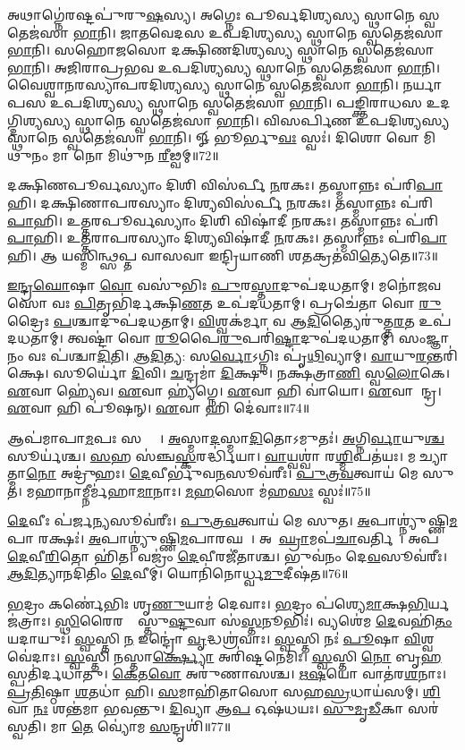 𑌅𑌥𑌾𑌗𑍍𑌨𑍇॑𑌰𑌷𑍍𑌟𑌪𑍁॑𑌰𑍁\ul{𑌷}𑌸𑍍𑌯। 
𑌅𑌗𑍍𑌨𑍇𑌃 𑌪𑍂𑌰𑍍𑌵𑌦𑌿𑌶𑍍𑌯𑌸𑍍𑌯 𑌸𑍍𑌥𑌾𑌨𑍇 𑌸𑍍𑌵𑌤𑍇𑌜॑𑌸𑌾 \ul{𑌭𑌾}𑌨𑌿। 
𑌜𑌾𑌤𑌵𑍇𑌦𑌸 𑌉𑌪𑌦𑌿𑌶𑍍𑌯𑌸𑍍𑌯 𑌸𑍍𑌥𑌾𑌨𑍇 𑌸𑍍𑌵𑌤𑍇𑌜॑𑌸𑌾 \ul{𑌭𑌾}𑌨𑌿। 
𑌸𑌹𑍋𑌜𑌸𑍋 𑌦𑌕𑍍𑌷𑌿𑌣𑌦𑌿𑌶𑍍𑌯𑌸𑍍𑌯 𑌸𑍍𑌥𑌾𑌨𑍇 𑌸𑍍𑌵𑌤𑍇𑌜॑𑌸𑌾 \ul{𑌭𑌾}𑌨𑌿। 
𑌅𑌜𑌿𑌰𑌾𑌪𑍍𑌰𑌭𑌵 𑌉𑌪𑌦𑌿𑌶𑍍𑌯𑌸𑍍𑌯 𑌸𑍍𑌥𑌾𑌨𑍇 𑌸𑍍𑌵𑌤𑍇𑌜॑𑌸𑌾 \ul{𑌭𑌾}𑌨𑌿। 
𑌵𑍈𑌶𑍍𑌵𑌾𑌨𑌰𑌸𑍍𑌯𑌾𑌪𑌰𑌦𑌿𑌶𑍍𑌯𑌸𑍍𑌯 𑌸𑍍𑌥𑌾𑌨𑍇 𑌸𑍍𑌵𑌤𑍇𑌜॑𑌸𑌾 \ul{𑌭𑌾}𑌨𑌿। 
𑌨𑌰𑍍𑌯𑌾𑌪𑌸 𑌉𑌪𑌦𑌿𑌶𑍍𑌯𑌸𑍍𑌯 𑌸𑍍𑌥𑌾𑌨𑍇 𑌸𑍍𑌵𑌤𑍇𑌜॑𑌸𑌾 \ul{𑌭𑌾}𑌨𑌿। 
𑌪𑌙𑍍𑌕𑍍𑌤𑌿𑌰𑌾𑌧𑌸 𑌉𑌦𑌗𑍍𑌦𑌿𑌶𑍍𑌯𑌸𑍍𑌯 𑌸𑍍𑌥𑌾𑌨𑍇 𑌸𑍍𑌵𑌤𑍇𑌜॑𑌸𑌾 \ul{𑌭𑌾}𑌨𑌿। 
𑌵𑌿𑌸𑌰𑍍𑌪𑌿𑌣 𑌉𑌪𑌦𑌿𑌶𑍍𑌯𑌸𑍍𑌯 𑌸𑍍𑌥𑌾𑌨𑍇 𑌸𑍍𑌵𑌤𑍇𑌜॑𑌸𑌾 \ul{𑌭𑌾}𑌨𑌿। 
𑍐 𑌭𑍂𑌰𑍍𑌭𑍁\ul{𑌵𑌃} 𑌸𑍍𑌵𑌃॑। 𑌦𑌿𑌶𑍋 𑌵𑍋 𑌮𑌿𑌥𑍁𑌨𑌂 𑌮𑌾 𑌨𑍋 𑌮𑌿𑌥𑍁॑𑌨 \ul{𑌰𑍀}𑌢𑍍𑌵𑌮𑍍॥72॥\anuvakamend


𑌦𑌕𑍍𑌷𑌿𑌣𑌪𑍂𑌰𑍍𑌵𑌸𑍍𑌯𑌾𑌂 𑌦𑌿𑌶𑌿 𑌵𑌿𑌸॑𑌰𑍍𑌪𑍀 \ul{𑌨}𑌰𑌕𑌃। 𑌤𑌸𑍍𑌮𑌾𑌨𑍍𑌨𑌃 𑌪॑𑌰𑌿\ul{𑌪𑌾}𑌹𑌿। 
𑌦𑌕𑍍𑌷𑌿𑌣𑌾𑌪𑌰𑌸𑍍𑌯𑌾𑌂 𑌦𑌿𑌶𑍍𑌯𑌵𑌿𑌸॑𑌰𑍍𑌪𑍀 \ul{𑌨}𑌰𑌕𑌃। 𑌤𑌸𑍍𑌮𑌾𑌨𑍍𑌨𑌃 𑌪॑𑌰𑌿\ul{𑌪𑌾}𑌹𑌿। 
𑌉𑌤𑍍𑌤𑌰𑌪𑍂𑌰𑍍𑌵𑌸𑍍𑌯𑌾𑌂 𑌦𑌿𑌶𑌿 𑌵𑌿𑌷𑌾॑𑌦𑍀 \ul{𑌨}𑌰𑌕𑌃। 𑌤𑌸𑍍𑌮𑌾𑌨𑍍𑌨𑌃 𑌪॑𑌰𑌿\ul{𑌪𑌾}𑌹𑌿। 
𑌉𑌤𑍍𑌤𑌰𑌾𑌪𑌰𑌸𑍍𑌯𑌾𑌂 𑌦𑌿𑌶𑍍𑌯𑌵𑌿𑌷𑌾॑𑌦𑍀 \ul{𑌨}𑌰𑌕𑌃। 𑌤𑌸𑍍𑌮𑌾𑌨𑍍𑌨𑌃 𑌪॑𑌰𑌿\ul{𑌪𑌾}𑌹𑌿। 
𑌆 𑌯𑌸𑍍𑌮𑌿𑌨𑍍𑌥𑍍𑌸𑌪𑍍𑌤 𑌵𑌾𑌸𑌵𑌾 𑌇𑌨𑍍𑌦𑍍𑌰𑌿𑌯𑌾𑌣𑌿 𑌶𑌤𑌕𑍍𑌰𑌤॑𑌵𑌿\ul{𑌤𑍍𑌯𑍇}𑌤𑍇॥73॥\anuvakamend


\ul{𑌇}\ul{𑌨𑍍𑌦𑍍𑌰}\ul{𑌘𑍋}𑌷𑌾 \ul{𑌵𑍋} 𑌵𑌸𑍁॑𑌭𑌿𑌃 \ul{𑌪𑍁}𑌰\ul{𑌸𑍍𑌤𑌾}𑌦𑍁𑌪॑𑌦𑌧𑌤𑌾𑌮𑍍‌। 
𑌮𑌨𑍋॑𑌜𑌵𑌸𑍋 𑌵𑌃 \ul{𑌪𑌿}𑌤𑍃𑌭𑌿॑𑌰𑍍𑌦𑌕𑍍𑌷𑌿\ul{𑌣}𑌤 𑌉𑌪॑𑌦𑌧𑌤𑌾𑌮𑍍‌। 
𑌪𑍍𑌰𑌚𑍇॑𑌤𑌾 𑌵𑍋 \ul{𑌰𑍁}𑌦𑍍𑌰𑍈𑌃 \ul{𑌪}𑌶𑍍𑌚𑌾𑌦𑍁𑌪॑𑌦𑌧𑌤𑌾𑌮𑍍‌। 
\ul{𑌵𑌿}𑌶𑍍𑌵𑌕॑𑌰𑍍𑌮𑌾 𑌵 𑌆\ul{𑌦𑌿}𑌤𑍍𑌯𑍈𑌰𑍁॑𑌤𑍍𑌤\ul{𑌰}𑌤 𑌉𑌪॑𑌦𑌧𑌤𑌾𑌮𑍍‌। 
𑌤𑍍𑌵𑌷𑍍𑌟𑌾॑ 𑌵𑍋 \ul{𑌰𑍂}𑌪𑍈\ul{𑌰𑍁}𑌪𑌰𑌿॑\ul{𑌷𑍍𑌟𑌾}𑌦𑍁𑌪॑\-𑌦𑌧𑌤𑌾𑌮𑍍‌। 
𑌸𑌂𑌜𑍍𑌞𑌾𑌨𑌂 𑌵𑌃 𑌪॑𑌶𑍍𑌚𑌾\ul{𑌦𑌿}𑌤𑌿। \ul{𑌆}\ul{𑌦𑌿}𑌤𑍍𑌯: 𑌸\ul{𑌰𑍍𑌵𑍋}𑌽𑌗𑍍𑌨𑌿𑌃 𑌪𑍃॑\ul{𑌥𑌿}𑌵𑍍𑌯𑌾𑌮𑍍‌। 
\ul{𑌵𑌾}𑌯𑍁\ul{𑌰}𑌨𑍍𑌤𑌰𑌿॑𑌕𑍍𑌷𑍇। 𑌸𑍂𑌰𑍍𑌯𑍋॑ \ul{𑌦𑌿}𑌵𑌿। \ul{𑌚}𑌨𑍍𑌦𑍍𑌰𑌮𑌾॑ \ul{𑌦𑌿}𑌕𑍍𑌷𑍁। 
𑌨𑌕𑍍𑌷॑𑌤𑍍𑌰𑌾\ul{𑌣𑌿} 𑌸𑍍𑌵\ul{𑌲𑍋}𑌕𑍇। \ul{𑌏}𑌵𑌾 𑌹𑍍𑌯𑍇॑𑌵। \ul{𑌏}𑌵𑌾 𑌹𑍍𑌯॑𑌗𑍍𑌨𑍇। 
\ul{𑌏}𑌵𑌾 𑌹𑌿 𑌵𑌾॑𑌯𑍋। \ul{𑌏}𑌵𑌾 𑌹𑍀᳚𑌨𑍍𑌦𑍍𑌰। \ul{𑌏}𑌵𑌾 𑌹𑌿 𑌪𑍂॑𑌷𑌨𑍍‌। \ul{𑌏}𑌵𑌾 𑌹𑌿 𑌦𑍇॑𑌵𑌾𑌃॥74॥\anuvakamend


𑌆𑌪॑𑌮𑌾𑌪𑌾\ul{𑌮}𑌪𑌃 𑌸𑌰𑍍𑌵𑌾𑌃᳚। \ul{𑌅}𑌸𑍍𑌮𑌾\ul{𑌦}𑌸𑍍𑌮𑌾\ul{𑌦𑌿}𑌤𑍋𑌽𑌮𑍁𑌤𑌃॑।
\ul{𑌅}𑌗𑍍𑌨𑌿\ul{𑌰𑍍𑌵𑌾}𑌯𑍁\ul{𑌶𑍍𑌚} 𑌸𑍂𑌰𑍍𑌯॑𑌶𑍍𑌚। \ul{𑌸}𑌹 𑌸॑𑌞𑍍𑌚\ul{𑌸𑍍𑌕}𑌰𑌰𑍍𑌦𑍍𑌧𑌿॑𑌯𑌾। 
\ul{𑌵𑌾}𑌯𑍍𑌵𑌶𑍍𑌵𑌾॑ 𑌰\ul{𑌶𑍍𑌮𑌿}𑌪𑌤॑𑌯𑌃। 𑌮𑌰𑍀᳚𑌚𑍍𑌯𑌾𑌤𑍍𑌮𑌾\ul{𑌨𑍋} 𑌅𑌦𑍍𑌰𑍁॑𑌹𑌃। 
\ul{𑌦𑍇}𑌵𑍀𑌰𑍍𑌭𑍁॑𑌵\ul{𑌨}𑌸𑍂𑌵॑𑌰𑍀𑌃। \ul{𑌪𑍁}\ul{𑌤𑍍𑌰}\ul{𑌵}𑌤𑍍𑌵𑌾𑌯॑ 𑌮𑍇 𑌸𑍁𑌤। 
𑌮𑌹𑌾𑌨𑌾𑌮𑍍𑌨𑍀𑌰𑍍𑌮॑𑌹𑌾\ul{𑌮𑌾}𑌨𑌾𑌃। \ul{𑌮}\ul{𑌹}𑌸𑍋 𑌮॑𑌹\ul{𑌸𑌃} 𑌸𑍍𑌵𑌃॑॥75॥


\ul{𑌦𑍇}𑌵𑍀𑌃 𑌪॑𑌰𑍍𑌜\ul{𑌨𑍍𑌯}𑌸𑍂𑌵॑𑌰𑍀𑌃। \ul{𑌪𑍁}\ul{𑌤𑍍𑌰}\ul{𑌵}𑌤𑍍𑌵𑌾𑌯॑ 𑌮𑍇 𑌸𑍁𑌤। 
\ul{𑌅}𑌪𑌾𑌶𑍍𑌨𑍍𑌯𑍁॑𑌷𑍍𑌣𑌿\ul{𑌮}𑌪𑌾 𑌰𑌕𑍍𑌷𑌃॑। \ul{𑌅}𑌪𑌾𑌶𑍍𑌨𑍍𑌯𑍁॑𑌷𑍍𑌣𑌿\-\ul{𑌮}𑌪𑌾𑌰𑌘𑌮𑍍᳚। 
𑌅𑌪𑌾᳚\ul{𑌘𑍍𑌰𑌾}𑌮𑌪॑\ul{𑌚𑌾}𑌵𑌰𑍍𑌤𑌿𑌮𑍍᳚। 𑌅𑌪॑\ul{𑌦𑍇}𑌵𑍀\ul{𑌰𑌿}𑌤𑍋 𑌹𑌿॑𑌤। 
𑌵𑌜𑍍𑌰𑌂॑ \ul{𑌦𑍇}𑌵𑍀𑌰𑌜𑍀॑𑌤𑌾𑌶𑍍𑌚। 𑌭𑍁𑌵॑𑌨𑌂 𑌦𑍇\ul{𑌵}𑌸𑍂𑌵॑𑌰𑍀𑌃। 
\ul{𑌆}\ul{𑌦𑌿}𑌤𑍍𑌯𑌾𑌨𑌦𑌿॑𑌤𑌿𑌂 \ul{𑌦𑍇}𑌵𑍀𑌮𑍍। 𑌯𑍋𑌨𑌿॑𑌨𑍋𑌰𑍍𑌧𑍍𑌵\ul{𑌮𑍁}𑌦𑍀𑌷॑𑌤॥76॥


\ul{𑌭}𑌦𑍍𑌰𑌂 𑌕𑌰𑍍𑌣𑍇॑𑌭𑌿𑌃 𑌶𑍃\ul{𑌣𑍁}𑌯𑌾𑌮॑ 𑌦𑍇𑌵𑌾𑌃। \ul{𑌭}𑌦𑍍𑌰𑌂 𑌪॑𑌶𑍍𑌯𑍇\ul{𑌮𑌾}𑌕𑍍𑌷\ul{𑌭𑌿}𑌰𑍍𑌯𑌜॑𑌤𑍍𑌰𑌾𑌃। 
\ul{𑌸𑍍𑌥𑌿}𑌰𑍈𑌰𑌙𑍍𑌗𑍈᳚𑌸𑍍𑌤𑍁\ul{𑌷𑍍𑌟𑍁}𑌵𑌾 𑌸॑\ul{𑌸𑍍𑌤}𑌨𑍂𑌭𑌿𑌃॑। 𑌵𑍍𑌯𑌶𑍇॑𑌮 \ul{𑌦𑍇}𑌵𑌹𑌿॑\ul{𑌤𑌂} 𑌯𑌦𑌾𑌯𑍁𑌃॑। 
\ul{𑌸𑍍𑌵}𑌸𑍍𑌤𑌿 \ul{𑌨} 𑌇𑌨𑍍𑌦𑍍𑌰𑍋॑ \ul{𑌵𑍃}𑌦𑍍𑌧𑌶𑍍𑌰॑𑌵𑌾𑌃। \ul{𑌸𑍍𑌵}𑌸𑍍𑌤𑌿 𑌨𑌃॑ \ul{𑌪𑍂}𑌷𑌾 \ul{𑌵𑌿}𑌶𑍍𑌵𑌵𑍇॑𑌦𑌾𑌃। 
\ul{𑌸𑍍𑌵}𑌸𑍍𑌤𑌿 \ul{𑌨}𑌸𑍍𑌤𑌾\ul{𑌰𑍍𑌕𑍍𑌷𑍍𑌯𑍋} 𑌅𑌰𑌿॑𑌷𑍍𑌟𑌨𑍇𑌮𑌿𑌃। \ul{𑌸𑍍𑌵}𑌸𑍍𑌤𑌿 \ul{𑌨𑍋} 𑌬𑍃\ul{𑌹}𑌸𑍍𑌪𑌤𑌿॑𑌰𑍍𑌦𑌧𑌾𑌤𑍁। 
\ul{𑌕𑍇}𑌤\ul{𑌵𑍋} 𑌅𑌰𑍁॑𑌣𑌾𑌸𑌶𑍍𑌚। \ul{𑌋}\ul{𑌷}𑌯𑍋 𑌵𑌾𑌤॑𑌰\ul{𑌶}𑌨𑌾𑌃। 
\ul{𑌪𑍍𑌰}\ul{𑌤𑌿}𑌷𑍍𑌠𑌾 \ul{𑌶}𑌤𑌧𑌾॑ 𑌹𑌿। \ul{𑌸}𑌮𑌾𑌹𑌿॑𑌤𑌾𑌸𑍋 𑌸𑌹\ul{𑌸𑍍𑌰}𑌧𑌾𑌯॑𑌸𑌮𑍍। 
\ul{𑌶𑌿}𑌵𑌾 \ul{𑌨𑌃} 𑌶𑌨𑍍𑌤॑𑌮𑌾 𑌭𑌵𑌨𑍍𑌤𑍁। \ul{𑌦𑌿}𑌵𑍍𑌯𑌾 𑌆\ul{𑌪} 𑌓𑌷॑𑌧𑌯𑌃। 
\ul{𑌸𑍁}\ul{𑌮𑍃}\ul{𑌡𑍀}𑌕𑌾 𑌸𑌰॑𑌸𑍍𑌵𑌤𑌿। 𑌮𑌾 \ul{𑌤𑍇} 𑌵𑍍𑌯𑍋॑𑌮 \ul{𑌸}𑌨𑍍𑌦𑍃𑌶𑌿॑॥77॥\anuvakamend


